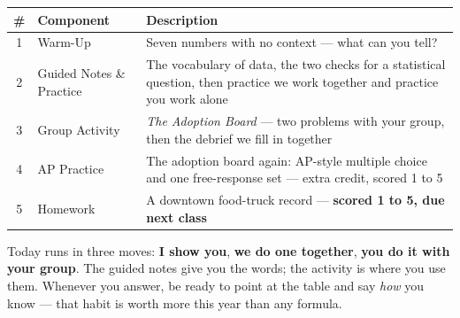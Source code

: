 \documentclass[10pt]{article}
\begin{document}
\boxguard[14]
\begin{tocbox}
\small
\renewcommand{\arraystretch}{1.5}
\begin{tabularx}{\linewidth}{@{} c l X @{}}
\rowcolor{sky}
\textbf{\#} & \textbf{Component} & \textbf{Description} \\
\midrule
1 & Warm-Up & Seven numbers with no context --- what can you tell? \\
2 & Guided Notes \& Practice & The vocabulary of data, the two checks for a statistical
                 question, then practice we work together and practice you work alone \\
3 & Group Activity & \emph{The Adoption Board} --- two problems with your group, then the
                 debrief we fill in together \\
4 & AP Practice & The adoption board again: AP-style multiple choice and one free-response set
                 --- extra credit, scored 1 to 5 \\
5 & Homework & A downtown food-truck record --- \textbf{scored 1 to 5, due next class} \\
\end{tabularx}
\end{tocbox}

\vspace{0.14in}

\boxguard[8]
\begin{remindbox}
\small
Today runs in three moves: \textbf{I show you}, \textbf{we do one together}, \textbf{you do
it with your group}. The guided notes give you the words; the activity is where you use them.
Whenever you answer, be ready to point at the table and say \emph{how} you know --- that habit
is worth more this year than any formula.
\end{remindbox}
\end{document}
